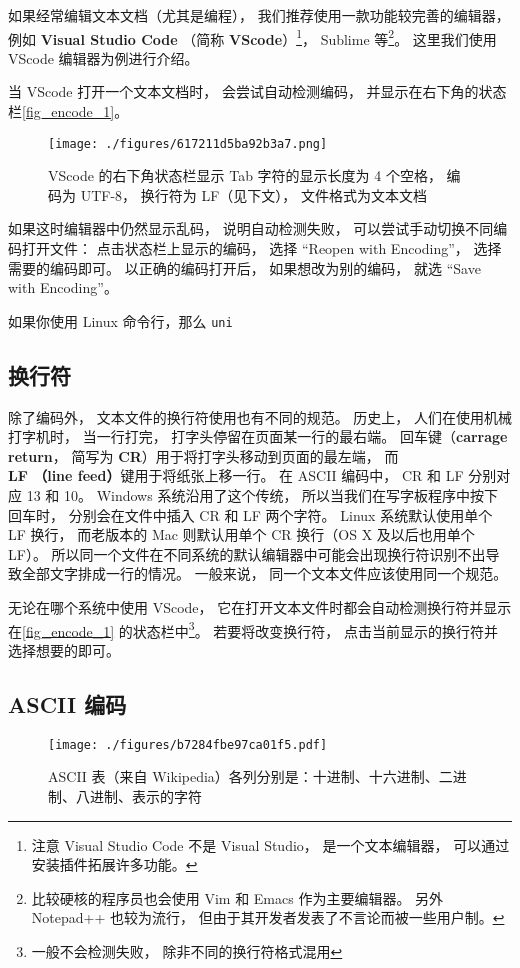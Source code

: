 如果经常编辑文本文档（尤其是编程）， 我们推荐使用一款功能较完善的编辑器， 例如 \textbf{Visual Studio Code} （简称 \textbf{VScode}）\footnote{注意 Visual Studio Code 不是 Visual Studio， 是一个文本编辑器， 可以通过安装插件拓展许多功能。}， Sublime 等\footnote{比较硬核的程序员也会使用 Vim 和 Emacs 作为主要编辑器。 另外 Notepad++ 也较为流行， 但由于其开发者发表了不言论而被一些用户制。}。 这里我们使用 VScode 编辑器为例进行介绍。

当 VScode 打开一个文本文档时， 会尝试自动检测编码， 并显示在右下角的状态栏\autoref{fig_encode_1}。
\begin{figure}[ht]
\centering
\texttt{[image: ./figures/617211d5ba92b3a7.png]}
\caption{VScode 的右下角状态栏显示 Tab 字符的显示长度为 4 个空格， 编码为 UTF-8， 换行符为 LF（见下文）， 文件格式为文本文档} \label{fig_encode_1}
\end{figure}
如果这时编辑器中仍然显示乱码， 说明自动检测失败， 可以尝试手动切换不同编码打开文件： 点击状态栏上显示的编码， 选择 “Reopen with Encoding”， 选择需要的编码即可。 以正确的编码打开后， 如果想改为别的编码， 就选 “Save with Encoding”。

如果你使用 Linux 命令行，那么 \verb`uni`

\subsection{换行符}\label{sub_encode_1}
除了编码外， 文本文件的换行符使用也有不同的规范。 历史上， 人们在使用机械打字机时， 当一行打完， 打字头停留在页面某一行的最右端。 回车键（\textbf{carrage return}， 简写为 \textbf{CR}）用于将打字头移动到页面的最左端， 而 \textbf{LF （line feed）}键用于将纸张上移一行。 在 ASCII 编码中， CR 和 LF 分别对应 13 和 10。 Windows 系统沿用了这个传统， 所以当我们在写字板程序中按下回车时， 分别会在文件中插入 CR 和 LF 两个字符。 Linux 系统默认使用单个 LF 换行， 而老版本的 Mac 则默认用单个 CR 换行（OS X 及以后也用单个 LF）。 所以同一个文件在不同系统的默认编辑器中可能会出现换行符识别不出导致全部文字排成一行的情况。 一般来说， 同一个文本文件应该使用同一个规范。

无论在哪个系统中使用 VScode， 它在打开文本文件时都会自动检测换行符并显示在\autoref{fig_encode_1} 的状态栏中\footnote{一般不会检测失败， 除非不同的换行符格式混用}。 若要将改变换行符， 点击当前显示的换行符并选择想要的即可。

\subsection{ASCII 编码}
\begin{figure}[ht]
\centering
\texttt{[image: ./figures/b7284fbe97ca01f5.pdf]}
\caption{ASCII 表（来自 Wikipedia）各列分别是：十进制、十六进制、二进制、八进制、表示的字符} \label{fig_encode_2}
\end{figure}



